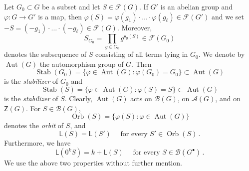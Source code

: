 \documentclass[a4paper, 10pt]{amsart}
\theoremstyle{plain}
\theoremstyle{definition}
\theoremstyle{definition}
\DeclareMathOperator{\Aut}{Aut} \DeclareMathOperator{\GL}{GL}
\DeclareMathOperator{\Stab}{Stab} \DeclareMathOperator{\lex}{lex}
\DeclareMathOperator{\orb}{Orb}
\numberwithin{equation}{section}
\begin{document}
Let $G_0 \subset G$ be a subset and let $S \in \mathcal F (G)$.
If $G'$ is an abelian group and $\varphi \colon G \to G'$ is a map, then $\varphi (S) = \varphi (g_1) \cdot \ldots \cdot \varphi (g_{\ell}) \in \mathcal F (G')$ and we set $-S = (-g_1) \cdot \ldots \cdot (-g_{\ell}) \in \mathcal F (G)$.  Moreover,
\begin{equation} \label{sequence-sub}
S_{G_0} = \prod_{g \in G_0} g^{\mathsf v_g (S)} \in \mathcal F (G_0)
\end{equation}
denotes the subsequence of $S$ consisting of all terms lying in $G_0$.
We denote by $\Aut (G)$ the automorphism group of $G$. Then
\[
\Stab (G_0) = \{ \varphi \in \Aut (G) \colon \varphi (G_0)=G_0 \} \subset \Aut (G)
\]
is the {\it stabilizer} of $G_0$ and
\[
\Stab (S) = \{ \varphi \in \Aut (G) \colon \varphi (S)=S \} \subset \Aut (G)
\]
is the {\it stabilizer} of $S$. Clearly, $\Aut (G)$ acts on $\mathcal B (G)$, on $\mathcal A (G)$, and on $\mathsf Z (G)$. For $S \in \mathcal B (G)$,
\[
\orb (S) = \{\varphi (S) \colon \varphi \in \Aut (G) \}
\]
denotes the {\it orbit} of $S$, and 
\begin{equation} \label{orbit-stability}
\mathsf L (S) = \mathsf L (S') \quad \text{ for every $S' \in \orb (S)$} \,.
\end{equation}
Furthermore, we have
\begin{equation} \label{shift-by-zeros}
\mathsf L (0^kS) = k + \mathsf L (S) \quad \text{ for every $S \in \mathcal B (G^{\bullet})$} \,.
\end{equation}
We use the above two properties without further mention.
\end{document}
